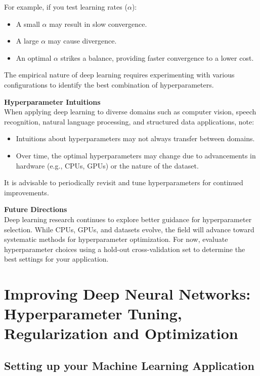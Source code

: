 \documentclass[letterpaper,12pt,notitlepage,twoside]{report}
\begin{document}
For example, if you test learning rates (\( \alpha \)):
\begin{itemize}[nosep]
    \item A small \( \alpha \) may result in slow convergence.
    \item A large \( \alpha \) may cause divergence.
    \item An optimal \( \alpha \) strikes a balance, providing faster convergence to a lower cost.
\end{itemize}

The empirical nature of deep learning requires experimenting with various configurations to identify the best combination of hyperparameters.

\textbf{Hyperparameter Intuitions} \\
When applying deep learning to diverse domains such as computer vision, speech recognition, natural language processing, and structured data applications, note:
\begin{itemize}[nosep]
    \item Intuitions about hyperparameters may not always transfer between domains.
    \item Over time, the optimal hyperparameters may change due to advancements in hardware (e.g., CPUs, GPUs) or the nature of the dataset.
\end{itemize}

It is advisable to periodically revisit and tune hyperparameters for continued improvements.

\textbf{Future Directions} \\
Deep learning research continues to explore better guidance for hyperparameter selection. While CPUs, GPUs, and datasets evolve, the field will advance toward systematic methods for hyperparameter optimization. For now, evaluate hyperparameter choices using a hold-out cross-validation set to determine the best settings for your application.

\chapter{Improving Deep Neural Networks: Hyperparameter Tuning, Regularization and Optimization} \label{ch:2}
\section{Setting up your Machine Learning Application}
\end{document}
